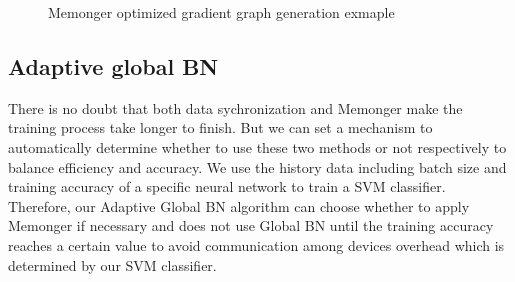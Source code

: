 \begin{figure}[h]
    \begin{center}
    \caption{Memonger optimized gradient graph generation exmaple }%
    \label{fig:Memonger}
    \end{center}
    \end{figure}

\subsection{Adaptive global BN}


There is no doubt that both data sychronization and Memonger make the training process take longer to finish. But we can set a mechanism to automatically determine whether to use these two methods or not respectively to balance efficiency and accuracy.
We use the history data including batch size and training accuracy of a specific neural network to train a SVM classifier. Therefore, our Adaptive Global BN algorithm can choose whether to apply Memonger if necessary and does not use Global BN until the training accuracy reaches a certain value to avoid communication among devices overhead which is determined by our SVM classifier.








